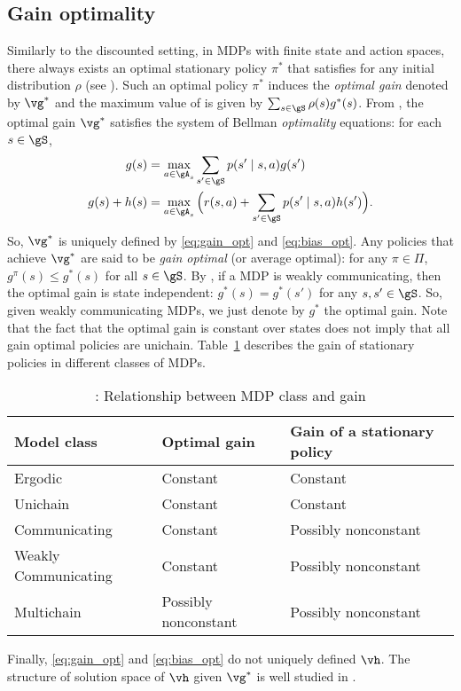 \subsection{Gain optimality}
\label{ch:mdp:sec:gain}

Similarly to the discounted setting, in MDPs with finite state and action spaces, there always exists an optimal stationary policy $\pi^*$ that satisfies  for any initial distribution $\rho$ (see \cite[Theorem~9.1.8]{puterman2014markov}).
Such an optimal policy $\pi^*$ induces the \emph{optimal gain} denoted by $\vg^*$ and the maximum value of  is given by $\sum_{s\in\gS} \rho(s)g^*(s)$.
From \cite[Chapter~9]{puterman2014markov}, the optimal gain $\vg^*$ satisfies the system of Bellman \emph{optimality} equations: for each $s\in\gS$,
\begin{align}
    g(s) &= \max_{a\in\gA_s} \sum_{s'\in\gS}p(s'\mid s,a)g(s') \label{eq:gain_opt} \\
    g(s) +h(s) &= \max_{a\in\gA_s}\Big(r(s,a) +\sum_{s'\in\gS}p(s'\mid s,a)h(s')\Big) \label{eq:bias_opt}.
\end{align}
So, $\vg^*$ is uniquely defined by \eqref{eq:gain_opt} and \eqref{eq:bias_opt}.
Any policies that achieve $\vg^*$ are said to be \emph{gain optimal} (or average optimal): for any $\pi\in\Pi$, $g^\pi(s)\le g^*(s)$ for all $s\in\gS$.
By \cite[Theorem~8.3.2]{puterman2014markov}, if a MDP is weakly communicating, then the optimal gain is state independent: $g^*(s)=g^*(s')$ for any $s,s'\in\gS$.
So, given weakly communicating MDPs, we just denote by $g^*$ the optimal gain.
Note that the fact that the optimal gain is constant over states does not imply that all gain optimal policies are unichain.
Table~\ref{tab:mdp_vs_gain} describes the gain of stationary policies in different classes of MDPs.
\begin{table}[ht]
    \begin{tabular}{lll}
        \hline
        Model class          & Optimal gain         & Gain of a stationary policy \\ \hline
        Ergodic              & Constant             & Constant                    \\
        Unichain             & Constant             & Constant                    \\
        Communicating        & Constant             & Possibly nonconstant        \\
        Weakly Communicating & Constant             & Possibly nonconstant        \\
        Multichain           & Possibly nonconstant & Possibly nonconstant       \\ \hline
    \end{tabular}
    \caption{\cite[Table~8.3.1]{puterman2014markov}: Relationship between MDP class and gain}
    \label{tab:mdp_vs_gain}
\end{table}
Finally, \eqref{eq:gain_opt} and \eqref{eq:bias_opt} do not uniquely defined $\vh$.
The structure of solution space of $\vh$ given $\vg^*$ is well studied in \cite{schweitzer1978functional}.

